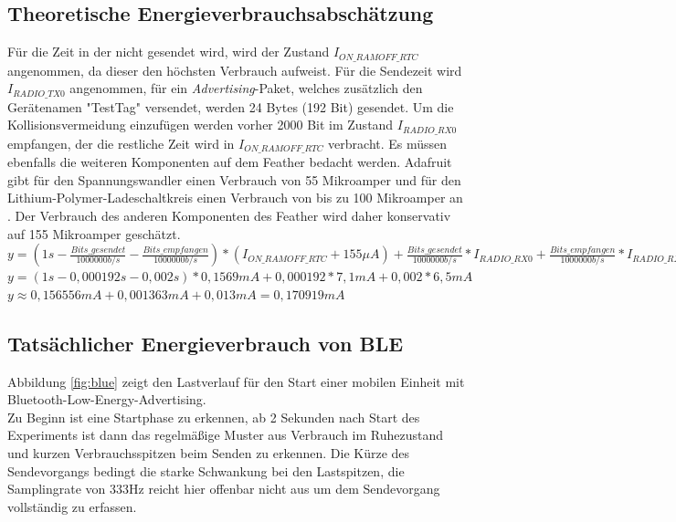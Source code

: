 \subsection{Theoretische Energieverbrauchsabschätzung}
Für die Zeit in der nicht gesendet wird, wird der Zustand $I_{ON\_RAMOFF\_RTC}$ angenommen, da dieser den höchsten Verbrauch aufweist.
Für die Sendezeit wird $I_{RADIO\_TX0}$ angenommen, für ein \emph{Advertising}-Paket, welches zusätzlich den Gerätenamen "{}TestTag"{} versendet, werden 24 Bytes (192 Bit) gesendet.
Um die Kollisionsvermeidung einzufügen werden vorher 2000 Bit im Zustand $I_{RADIO\_RX0}$ empfangen, der die restliche Zeit wird in $I_{ON\_RAMOFF\_RTC}$ verbracht. 
Es müssen ebenfalls die weiteren Komponenten auf dem Feather bedacht werden. 
Adafruit gibt für den Spannungswandler einen Verbrauch von 55 Mikroamper und für den Lithium-Polymer-Ladeschaltkreis einen Verbrauch von bis zu 100 Mikroamper an \cite{fried2016lora}. 
Der Verbrauch des anderen Komponenten des Feather wird daher konservativ auf 155 Mikroamper geschätzt.\\[1cm]

$y = (1s-\frac{Bits\_gesendet}{1000000 b/s} - \frac{Bits\_empfangen}{1000000 b/s}) * (I_{ON\_RAMOFF\_RTC} + 155 {\mu}A) + \frac{Bits\_gesendet}{1000000 b/s} * I_{RADIO\_RX0} + \frac{Bits\_empfangen}{1000000 b/s} * I_{RADIO\_RX0}$\\[0.5cm]
$y = (1s - 0,000192s - 0,002s) * 0,1569mA + 0,000192 * 7,1mA + 0,002 * 6,5mA$\\[0.5cm]
$y \approx 0,156556mA + 0,001363mA + 0,013mA = 0,170919mA$ \\[1cm]

\subsection{Tatsächlicher Energieverbrauch von BLE}
\label{ch:phase3:sec:powerble}
Abbildung \ref{fig:blue} zeigt den Lastverlauf für den Start einer mobilen Einheit mit Bluetooth-Low-Energy-Advertising.\\
Zu Beginn ist eine Startphase zu erkennen, ab 2 Sekunden nach Start des Experiments ist dann das regelmäßige Muster aus Verbrauch im Ruhezustand und kurzen Verbrauchsspitzen beim Senden zu erkennen.
Die Kürze des Sendevorgangs bedingt die starke Schwankung bei den Lastspitzen, die Samplingrate von 333Hz reicht hier offenbar nicht aus um dem Sendevorgang vollständig zu erfassen.\\


